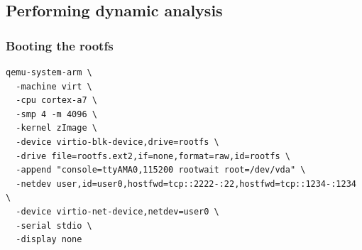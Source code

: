 \subsection{Performing dynamic analysis}
\begin{frame}[fragile]
  \frametitle{Booting the rootfs}
  \footnotesize
  \begin{verbatim}
qemu-system-arm \
  -machine virt \
  -cpu cortex-a7 \
  -smp 4 -m 4096 \
  -kernel zImage \
  -device virtio-blk-device,drive=rootfs \
  -drive file=rootfs.ext2,if=none,format=raw,id=rootfs \
  -append "console=ttyAMA0,115200 rootwait root=/dev/vda" \
  -netdev user,id=user0,hostfwd=tcp::2222-:22,hostfwd=tcp::1234-:1234 \
  -device virtio-net-device,netdev=user0 \
  -serial stdio \
  -display none
  \end{verbatim}
\end{frame}
